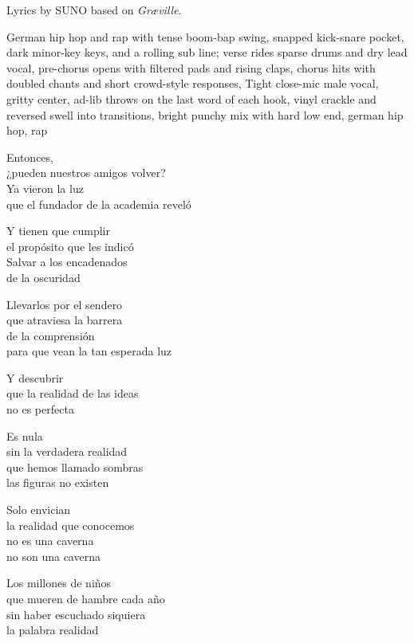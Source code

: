 
\begin{notes}
Lyrics by SUNO based on \emph{Gr\ae ville}.
\end{notes}
\begin{style}
German hip hop and rap with tense boom-bap swing, snapped kick-snare pocket, dark minor-key keys, and a rolling sub line; verse rides sparse drums and dry lead vocal, pre-chorus opens with filtered pads and rising claps, chorus hits with doubled chants and short crowd-style responses, Tight close-mic male vocal, gritty center, ad-lib throws on the last word of each hook, vinyl crackle and reversed swell into transitions, bright punchy mix with hard low end, german hip hop, rap
\end{style}
\begin{lyrics}
Entonces,\\
¿pueden nuestros amigos volver?\\
Ya vieron la luz\\
que el fundador de la academia reveló

Y tienen que cumplir\\
el propósito que les indicó\\
Salvar a los encadenados\\
de la oscuridad

Llevarlos por el sendero\\
que atraviesa la barrera\\
de la comprensión\\
para que vean la tan esperada luz

Y descubrir\\
que la realidad de las ideas\\
no es perfecta

Es nula\\
sin la verdadera realidad\\
que hemos llamado sombras\\
las figuras no existen

Solo envician\\
la realidad que conocemos\\
no es una caverna\\
no son una caverna

Los millones de niños\\
que mueren de hambre cada año\\
sin haber escuchado siquiera\\
la palabra realidad


\end{lyrics}
